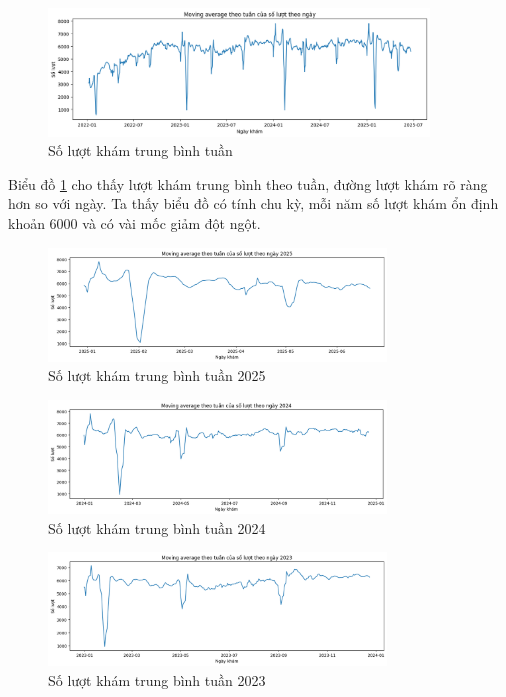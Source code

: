     \begin{figure}[htp]
        \centering
        \includegraphics[width=0.90\textwidth]{images/TS_yte_tong_week.png}
        \caption{Số lượt khám trung bình tuần}
        \label{fig:TS_yte_tong_week}
    \end{figure}
    \FloatBarrier

    Biểu đồ \ref{fig:TS_yte_tong_week} cho thấy lượt khám trung bình theo tuần, đường lượt khám rõ ràng hơn so với ngày. Ta thấy biểu đồ có tính chu kỳ, mỗi năm số lượt khám ổn định khoản 6000 và có vài mốc giảm đột ngột.

    \begin{figure}[htp]
        \centering
        \includegraphics[width=0.80\textwidth]{images/TS_yte_tong_week2025.png}
        \caption{Số lượt khám trung bình tuần 2025}
        \label{fig:TS_yte_tong_week2025}
    \end{figure}
    \FloatBarrier

    \begin{figure}[htp]
        \centering
        \includegraphics[width=0.80\textwidth]{images/TS_yte_tong_week2024.png}
        \caption{Số lượt khám trung bình tuần 2024}
        \label{fig:TS_yte_tong_week2024}
    \end{figure}
    \FloatBarrier

    \begin{figure}[htp]
        \centering
        \includegraphics[width=0.80\textwidth]{images/TS_yte_tong_week2023.png}
        \caption{Số lượt khám trung bình tuần 2023}
        \label{fig:TS_yte_tong_week2023}
    \end{figure}
    \FloatBarrier

